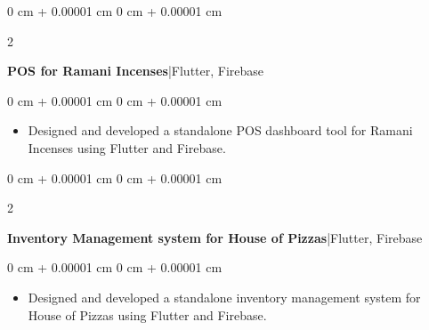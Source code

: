 \documentclass[10pt, letterpaper]{article}
\newenvironment{highlights}{
    \begin{itemize}[
        topsep=0.10 cm,
        parsep=0.10 cm,
        partopsep=0pt,
        itemsep=0pt,
        leftmargin=0 cm + 10pt
    ]
}{
    \end{itemize}
} %
\newenvironment{onecolentry}{
    \begin{adjustwidth}{
        0 cm + 0.00001 cm
    }{
        0 cm + 0.00001 cm
    }
}{
    \end{adjustwidth}
} %
\newenvironment{twocolentry}[2][]{
    \onecolentry
    \def\secondColumn{#2}
    \setcolumnwidth{\fill, 4.5 cm}
    \begin{paracol}{2}
}{
    \switchcolumn \raggedleft \secondColumn
    \end{paracol}
    \endonecolentry
} %
\begin{document}
        \begin{twocolentry}{}
            \textbf{POS for Ramani Incenses}|Flutter, Firebase
        \end{twocolentry}
        \begin{onecolentry}
         \begin{highlights}
                \item Designed and developed a standalone POS dashboard tool for Ramani Incenses using Flutter and Firebase.
            \end{highlights}
        \end{onecolentry}

        \vspace{0.2 cm}

        \begin{twocolentry}{}
            \textbf{Inventory Management system for House of Pizzas}|Flutter, Firebase
        \end{twocolentry}
        \begin{onecolentry}
         \begin{highlights}
                \item Designed and developed a standalone inventory management system for House of Pizzas using Flutter and Firebase.
            \end{highlights}
        \end{onecolentry}

      
\end{document}
